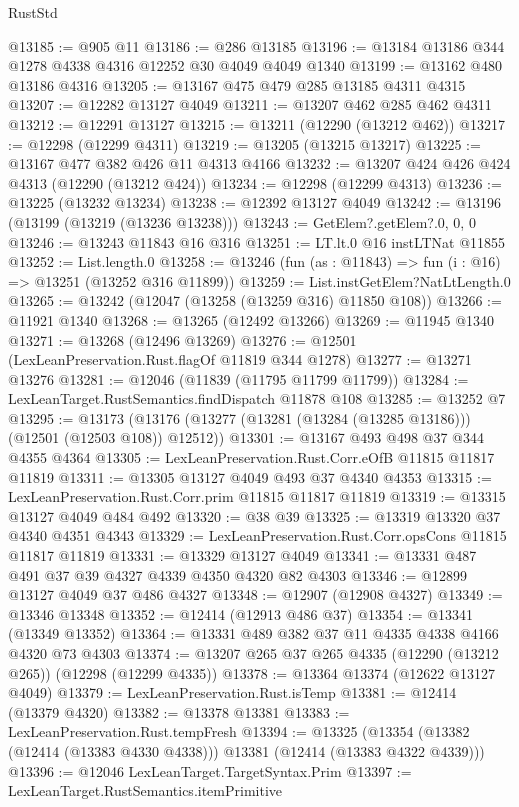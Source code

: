\begin{lexlean}{RustStd}
\begin{coremodule}
{\begin{coremodule}
{{{{{{{{{{{{{{{{{{{{{{{{{{{{{{{{{{{{{{{{{{{{{{{{{{@13185 := @905 @11
@13186 := @286 @13185
@13196 := @13184 @13186 @344 @1278 @4338 @4316 @12252 @30 @4049 @4049 @1340
@13199 := @13162 @480 @13186 @4316
@13205 := @13167 @475 @479 @285 @13185 @4311 @4315
@13207 := @12282 @13127 @4049
@13211 := @13207 @462 @285 @462 @4311
@13212 := @12291 @13127
@13215 := @13211 (@12290 (@13212 @462))
@13217 := @12298 (@12299 @4311)
@13219 := @13205 (@13215 @13217)
@13225 := @13167 @477 @382 @426 @11 @4313 @4166
@13232 := @13207 @424 @426 @424 @4313 (@12290 (@13212 @424))
@13234 := @12298 (@12299 @4313)
@13236 := @13225 (@13232 @13234)
@13238 := @12392 @13127 @4049
@13242 := @13196 (@13199 (@13219 (@13236 @13238)))
@13243 := GetElem?.getElem?.{0, 0, 0}
@13246 := @13243 @11843 @16 @316
@13251 := LT.lt.{0} @16 instLTNat @11855
@13252 := List.length.{0}
@13258 := @13246 (fun (as : @11843) => fun (i : @16) => @13251 (@13252 @316 @11899))
@13259 := List.instGetElem?NatLtLength.{0}
@13265 := @13242 (@12047 (@13258 (@13259 @316) @11850 @108))
@13266 := @11921 @1340
@13268 := @13265 (@12492 @13266)
@13269 := @11945 @1340
@13271 := @13268 (@12496 @13269)
@13276 := @12501 (LexLeanPreservation.Rust.flagOf @11819 @344 @1278)
@13277 := @13271 @13276
@13281 := @12046 (@11839 (@11795 @11799 @11799))
@13284 := LexLeanTarget.RustSemantics.findDispatch @11878 @108
@13285 := @13252 @7
@13295 := @13173 (@13176 (@13277 (@13281 (@13284 (@13285 @13186))) (@12501 (@12503 @108)) @12512))
@13301 := @13167 @493 @498 @37 @344 @4355 @4364
@13305 := LexLeanPreservation.Rust.Corr.eOfB @11815 @11817 @11819
@13311 := @13305 @13127 @4049 @493 @37 @4340 @4353
@13315 := LexLeanPreservation.Rust.Corr.prim @11815 @11817 @11819
@13319 := @13315 @13127 @4049 @484 @492
@13320 := @38 @39
@13325 := @13319 @13320 @37 @4340 @4351 @4343
@13329 := LexLeanPreservation.Rust.Corr.opsCons @11815 @11817 @11819
@13331 := @13329 @13127 @4049
@13341 := @13331 @487 @491 @37 @39 @4327 @4339 @4350 @4320 @82 @4303
@13346 := @12899 @13127 @4049 @37 @486 @4327
@13348 := @12907 (@12908 @4327)
@13349 := @13346 @13348
@13352 := @12414 (@12913 @486 @37)
@13354 := @13341 (@13349 @13352)
@13364 := @13331 @489 @382 @37 @11 @4335 @4338 @4166 @4320 @73 @4303
@13374 := @13207 @265 @37 @265 @4335 (@12290 (@13212 @265)) (@12298 (@12299 @4335))
@13378 := @13364 @13374 (@12622 @13127 @4049)
@13379 := LexLeanPreservation.Rust.isTemp
@13381 := @12414 (@13379 @4320)
@13382 := @13378 @13381
@13383 := LexLeanPreservation.Rust.tempFresh
@13394 := @13325
    (@13354 (@13382 (@12414 (@13383 @4330 @4338))) @13381 (@12414 (@13383 @4322 @4339)))
@13396 := @12046 LexLeanTarget.TargetSyntax.Prim
@13397 := LexLeanTarget.RustSemantics.itemPrimitive
}}}}}}}}}}}}}}}}}}}}}}}}}}}}}}}}}}}}}}}}}}}}}}}}}}
\end{coremodule}}
\end{coremodule}
\end{lexlean}

